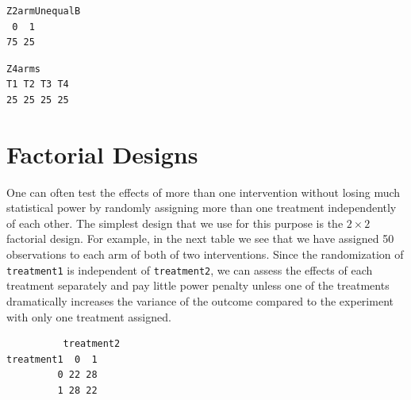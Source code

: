\documentclass[
  12pt,
]{book}
\newenvironment{Shaded}{\begin{snugshade}}{\end{snugshade}}
\newcommand{\AttributeTok}[1]{\textcolor[rgb]{0.77,0.63,0.00}{#1}}
\newcommand{\DocumentationTok}[1]{\textcolor[rgb]{0.56,0.35,0.01}{\textbf{\textit{#1}}}}
\newcommand{\FunctionTok}[1]{\textcolor[rgb]{0.00,0.00,0.00}{#1}}
\newcommand{\NormalTok}[1]{#1}
\newcommand{\OtherTok}[1]{\textcolor[rgb]{0.56,0.35,0.01}{#1}}
\newcommand{\SpecialCharTok}[1]{\textcolor[rgb]{0.00,0.00,0.00}{#1}}
\theoremstyle{definition}
\theoremstyle{definition}
\theoremstyle{definition}
\theoremstyle{remark}
\begin{document}
\begin{verbatim}
Z2armUnequalB
 0  1 
75 25 
\end{verbatim}

\begin{Shaded}
\end{Shaded}

\begin{verbatim}
Z4arms
T1 T2 T3 T4 
25 25 25 25 
\end{verbatim}

\hypertarget{factorial-designs}{%
\section{Factorial Designs}\label{factorial-designs}}

One can often test the effects of more than one intervention without
losing much statistical power by randomly assigning more than one
treatment independently of each other. The simplest design that we use
for this purpose is the \(2 \times 2\) factorial design. For example, in
the next table we see that we have assigned 50 observations to each arm
of both of two interventions. Since the randomization of
\texttt{treatment1} is independent of \texttt{treatment2}, we can assess
the effects of each treatment separately and pay little power penalty
unless one of the treatments dramatically increases the variance of the
outcome compared to the experiment with only one treatment assigned.

\begin{Shaded}
\end{Shaded}

\begin{verbatim}
          treatment2
treatment1  0  1
         0 22 28
         1 28 22
\end{verbatim}
\end{document}
